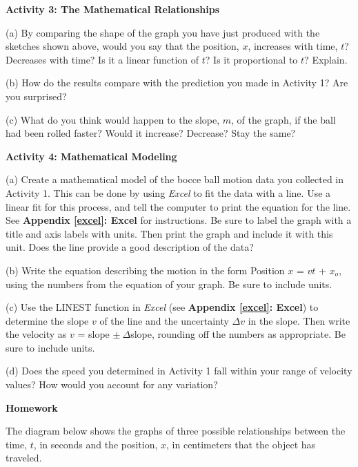 \pagebreak[3]
\textbf{Activity 3: The Mathematical Relationships} 

(a) By comparing the shape of the graph you have just produced with the sketches
shown above, would you say that the position, $x$, increases with time, 
$t$? Decreases
with time? Is it a linear function of $t$? Is it proportional to $t$? Explain.
\vspace{20mm}

(b) How do the results compare with the prediction you made in Activity 1? Are
you surprised?
\vspace{20mm}

(c) What do you think would happen to the slope, $m$, of the graph, if the ball
had been rolled faster? Would it increase? Decrease? Stay the same?
\vspace{20mm}

\textbf{Activity 4: Mathematical Modeling} 

(a) Create a mathematical model of the bocce ball motion data you collected
in Activity 1. This can be done by using \textit{Excel} to fit the data with
a line. Use a linear fit for this process, and tell the computer to print
the equation for the line. See \textbf{Appendix \ref{excel}: Excel} for instructions. 
Be sure to label the graph with a title and axis labels with units. Then print
the graph and include it with this unit.
Does the line provide a good description of the data?
\answerspace{20mm}

(b) Write the equation describing the motion in the form Position $x$ = $vt$ + 
$x_{o}$, using the numbers from the equation of your graph.  Be sure to include units.
\answerspace{20mm}

(c) Use the LINEST function in \textit{Excel} (see \textbf{Appendix \ref{excel}: Excel}) to determine the slope $v$ of the line and the uncertainty \( \Delta  v\) in the slope.  Then write 
the velocity as $v$ = slope \( \pm \ \Delta  \)slope, rounding off the numbers as appropriate.  Be sure to include units.
\answerspace{30mm}

\pagebreak[2]
(d) Does the speed you determined in Activity 1 fall within your range of velocity values?  How would you account for any variation?
\answerspace{30mm}

\textbf{Homework} 

The diagram below shows the graphs of three possible relationships between the
time, $t$, in seconds and the position, $x$, in centimeters that the object has
traveled.

